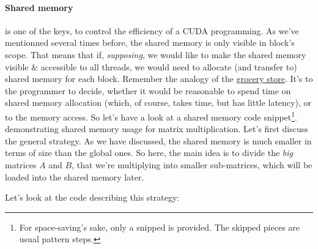 \documentclass[12pt]{article}
\begin{document}
\paragraph*{Shared memory} is one of the keys, to control the efficiency of a CUDA programming. 
As we've mentionned several times before, the shared memory is only visible in block's scope. That means that 
if, \textit{supposing}, we would like to make the shared memory visible \& accessible to all threads, we would 
need to allocate (and transfer to) shared memory for each block. Remember the analogy of the \hyperref[grocery_store]{grocery store}.
It's to the programmer to decide, whether it would be reasonable to spend time on shared memory allocation
 (which, of course, takes time, but has little latency), or to the memory access.
So let's have a look at a shared memory code snippet\footnote{For space-saving's sake, only a snipped is provided. The skipped pieces are usual pattern steps.}.
demonstrating shared memory usage for matrix multiplication. 
Let's first discuss the general strategy. As we have discussed, the shared memory is much smaller in terms of size 
than the global ones. So here, the main idea is to divide the \textit{big} matrices $A$ and $B$, that we're multiplying into smaller
sub-matrices, which will be loaded into the shared memory later.

Let's look at the code describing this strategy:
\end{document}
